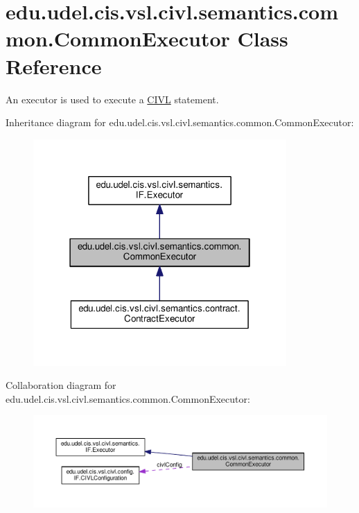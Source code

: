 \hypertarget{classedu_1_1udel_1_1cis_1_1vsl_1_1civl_1_1semantics_1_1common_1_1CommonExecutor}{}\section{edu.\+udel.\+cis.\+vsl.\+civl.\+semantics.\+common.\+Common\+Executor Class Reference}
\label{classedu_1_1udel_1_1cis_1_1vsl_1_1civl_1_1semantics_1_1common_1_1CommonExecutor}


An executor is used to execute a \hyperlink{classedu_1_1udel_1_1cis_1_1vsl_1_1civl_1_1CIVL}{C\+I\+V\+L} statement.  




Inheritance diagram for edu.\+udel.\+cis.\+vsl.\+civl.\+semantics.\+common.\+Common\+Executor\+:
\nopagebreak
\begin{figure}[H]
\begin{center}
\leavevmode
\includegraphics[width=274pt]{classedu_1_1udel_1_1cis_1_1vsl_1_1civl_1_1semantics_1_1common_1_1CommonExecutor__inherit__graph}
\end{center}
\end{figure}


Collaboration diagram for edu.\+udel.\+cis.\+vsl.\+civl.\+semantics.\+common.\+Common\+Executor\+:
\nopagebreak
\begin{figure}[H]
\begin{center}
\leavevmode
\includegraphics[width=350pt]{classedu_1_1udel_1_1cis_1_1vsl_1_1civl_1_1semantics_1_1common_1_1CommonExecutor__coll__graph}
\end{center}
\end{figure}
